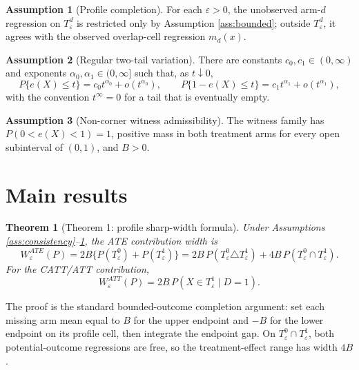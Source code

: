 \documentclass[11pt]{article}
\theoremstyle{definition}
\newtheorem{assumption}{Assumption}
\theoremstyle{plain}
\newtheorem{theorem}{Theorem}
\theoremstyle{remark}
\begin{document}
\begin{assumption}[Profile completion]\label{ass:completion}
For each \(\varepsilon>0\), the unobserved arm-\(d\) regression on
\(T_\varepsilon^d\) is restricted only by Assumption \ref{ass:bounded}; outside
\(T_\varepsilon^d\), it agrees with the observed overlap-cell regression \(m_d(x)\).
\end{assumption}

\begin{assumption}[Regular two-tail variation]\label{ass:regularvariation}
There are constants \(c_0,c_1\in(0,\infty)\) and exponents
\(\alpha_0,\alpha_1\in(0,\infty]\) such that, as \(t\downarrow0\),
\[
P\{e(X)\leq t\}=c_0 t^{\alpha_0}+o(t^{\alpha_0}),\qquad
P\{1-e(X)\leq t\}=c_1 t^{\alpha_1}+o(t^{\alpha_1}),
\]
with the convention \(t^\infty=0\) for a tail that is eventually empty.
\end{assumption}

\begin{assumption}[Non-corner witness admissibility]\label{ass:witness}
The witness family has \(P(0<e(X)<1)=1\), positive mass in both treatment arms for
every open subinterval of \((0,1)\), and \(B>0\).
\end{assumption}

\section{Main results}
\begin{theorem}[Theorem 1: profile sharp-width formula]\label{thm:profile-width}
Under Assumptions \ref{ass:consistency}--\ref{ass:completion}, the ATE contribution width is
\[
W_\varepsilon^{ATE}(P)=2B\{P(T_\varepsilon^0)+P(T_\varepsilon^1)\}
  =2B\,P(T_\varepsilon^0\triangle T_\varepsilon^1)
    +4B\,P(T_\varepsilon^0\cap T_\varepsilon^1).
\]
For the CATT/ATT contribution,
\[
W_\varepsilon^{ATT}(P)=2B\,P(X\in T_\varepsilon^1\mid D=1).
\]
\end{theorem}
The proof is the standard bounded-outcome completion argument: set each missing arm mean
equal to \(B\) for the upper endpoint and \(-B\) for the lower endpoint on its profile
cell, then integrate the endpoint gap. On \(T_\varepsilon^0\cap T_\varepsilon^1\), both
potential-outcome regressions are free, so the treatment-effect range has width \(4B\).
\end{document}
